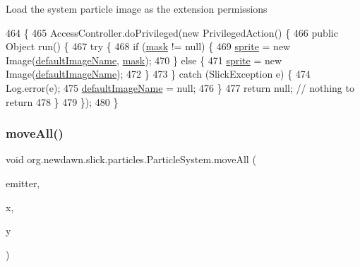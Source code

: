 Load the system particle image as the extension permissions 
\begin{DoxyCode}
464                                            \{
465         AccessController.doPrivileged(\textcolor{keyword}{new} PrivilegedAction() \{
466             \textcolor{keyword}{public} Object run() \{
467                 \textcolor{keywordflow}{try} \{
468                     \textcolor{keywordflow}{if} (\mbox{\hyperlink{classorg_1_1newdawn_1_1slick_1_1particles_1_1_particle_system_a75111c35416632fb81c11c808d0158d0}{mask}} != null) \{
469                         \mbox{\hyperlink{classorg_1_1newdawn_1_1slick_1_1particles_1_1_particle_system_a42359ac9175deb095eaa520263e352da}{sprite}} = \textcolor{keyword}{new} Image(\mbox{\hyperlink{classorg_1_1newdawn_1_1slick_1_1particles_1_1_particle_system_abfa2b543e5b6bca876a15493efb25688}{defaultImageName}}, 
      \mbox{\hyperlink{classorg_1_1newdawn_1_1slick_1_1particles_1_1_particle_system_a75111c35416632fb81c11c808d0158d0}{mask}});
470                     \} \textcolor{keywordflow}{else} \{
471                         \mbox{\hyperlink{classorg_1_1newdawn_1_1slick_1_1particles_1_1_particle_system_a42359ac9175deb095eaa520263e352da}{sprite}} = \textcolor{keyword}{new} Image(\mbox{\hyperlink{classorg_1_1newdawn_1_1slick_1_1particles_1_1_particle_system_abfa2b543e5b6bca876a15493efb25688}{defaultImageName}});
472                     \}
473                 \} \textcolor{keywordflow}{catch} (SlickException e) \{
474                     Log.error(e);
475                     \mbox{\hyperlink{classorg_1_1newdawn_1_1slick_1_1particles_1_1_particle_system_abfa2b543e5b6bca876a15493efb25688}{defaultImageName}} = null;
476                 \}
477                 \textcolor{keywordflow}{return} null; \textcolor{comment}{// nothing to return}
478             \}
479         \});
480     \}
\end{DoxyCode}
\mbox{\label{classorg_1_1newdawn_1_1slick_1_1particles_1_1_particle_system_ae1cc7072ad984043d041ad2ef7ca50ad}} 
\subsubsection{\texorpdfstring{move\+All()}{moveAll()}}
{\footnotesize\ttfamily void org.\+newdawn.\+slick.\+particles.\+Particle\+System.\+move\+All (\begin{DoxyParamCaption}\item[{\mbox{\hyperlink{interfaceorg_1_1newdawn_1_1slick_1_1particles_1_1_particle_emitter}{Particle\+Emitter}}}]{emitter,  }\item[{float}]{x,  }\item[{float}]{y }\end{DoxyParamCaption})\hspace{0.3cm}{\ttfamily [inline]}}

